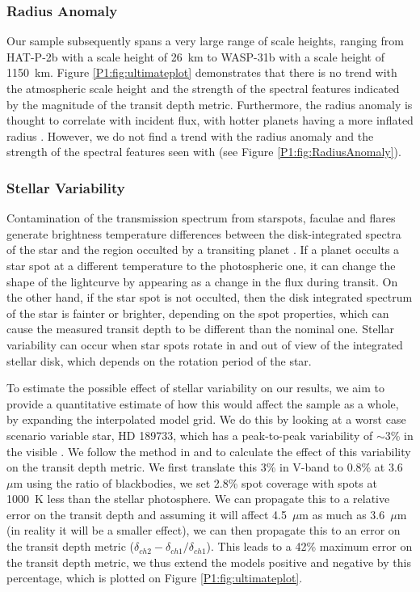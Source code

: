 \subsubsection{Radius Anomaly}

Our sample subsequently spans a very large range of scale heights, ranging from HAT-P-2b with a scale height of 26~km to WASP-31b with a scale height of 1150~km. Figure \ref{P1:fig:ultimateplot} demonstrates that there is no trend with the atmospheric scale height and the strength of the spectral features indicated by the magnitude of the transit depth metric. Furthermore, the radius anomaly is thought to correlate with incident flux, with hotter planets having a more inflated radius \citep{Thorngren2018}. However, we do not find a trend with the radius anomaly and the strength of the spectral features seen with \spitzer (see Figure \ref{P1:fig:RadiusAnomaly}).

\subsubsection{Stellar Variability}
\label{P1:sec:stellarVariabilitiy}

Contamination of the transmission spectrum from starspots, faculae and flares generate brightness temperature differences between the disk-integrated spectra of the star and the region occulted by a transiting planet \citep{Desert2011d, Pont2008, Sing2011}. If a planet occults a star spot at a different temperature to the photospheric one, it can change the shape of the lightcurve by appearing as a change in the flux during transit. On the other hand, if the star spot is not occulted, then the disk integrated spectrum of the star is  fainter or brighter, depending on the spot properties, which can cause the measured transit depth to be different than the nominal one. Stellar variability can occur when star spots rotate in and out of view of the integrated stellar disk, which depends on the rotation period of the star.

To estimate the possible effect of stellar variability on our results, we aim to provide a quantitative estimate of how this would affect the sample as a whole, by expanding the interpolated model grid. We do this by looking at a worst case scenario variable star, HD 189733, which has a peak-to-peak variability of $\sim 3$\% in the visible \citep{Henry2008}. We follow the method in \citet{Desert2011d, Sing2011} and \citet{Berta2012} to calculate the effect of this variability on the transit depth metric. We first translate this 3\% in V-band to 0.8\% at 3.6~$\mu$m using the ratio of blackbodies, we set 2.8\% spot coverage with spots at 1000~K less than the stellar photosphere. We can propagate this to a relative error on the transit depth and assuming it will affect 4.5~$\mu$m as much as 3.6~$\mu$m (in reality it will be a smaller effect), we can then propagate this to an error on the transit depth metric ($\delta_{ch2} - \delta_{ch1} / \delta_{ch1}$). This leads to a 42\% maximum error on the transit depth metric, we thus extend the models positive and negative by this percentage, which is plotted on Figure \ref{P1:fig:ultimateplot}.

